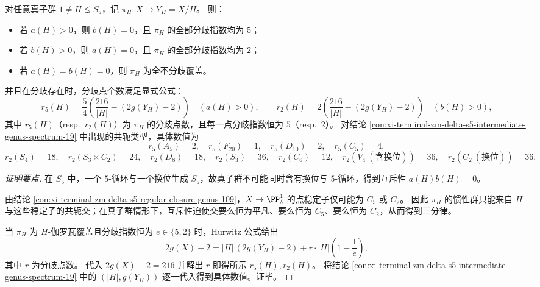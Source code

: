 \begin{conclusion}\label{con:xi-terminal-zm-delta-s5-branching-trichotomy-proper-quotients}
对任意真子群 \(1\neq H\lneq S_5\)，记 \(\pi_H:X\to Y_H=X/H\)。
则：
\begin{itemize}
  \item 若 \(a(H)>0\)，则 \(b(H)=0\)，且 \(\pi_H\) 的全部分歧指数均为 \(5\)；
  \item 若 \(b(H)>0\)，则 \(a(H)=0\)，且 \(\pi_H\) 的全部分歧指数均为 \(2\)；
  \item 若 \(a(H)=b(H)=0\)，则 \(\pi_H\) 为全不分歧覆盖。
\end{itemize}
并且在分歧存在时，分歧点个数满足显式公式：
\[
r_5(H)=\frac{5}{4}\left(\frac{216}{|H|}-(2g(Y_H)-2)\right)\quad(a(H)>0),
\qquad
r_2(H)=2\left(\frac{216}{|H|}-(2g(Y_H)-2)\right)\quad(b(H)>0),
\]
其中 \(r_5(H)\)（resp.\ \(r_2(H)\)）为 \(\pi_H\) 的分歧点数，且每一点分歧指数恒为 \(5\)（resp.\ \(2\)）。
对结论 \ref{con:xi-terminal-zm-delta-s5-intermediate-genus-spectrum-19} 中出现的共轭类型，具体数值为
\[
r_5(A_5)=2,\quad r_5(F_{20})=1,\quad r_5(D_{10})=2,\quad r_5(C_5)=4,
\]
\[
r_2(S_4)=18,\quad r_2(S_3\times C_2)=24,\quad r_2(D_8)=18,\quad r_2(S_3)=36,\quad r_2(C_6)=12,\quad r_2(V_4\ (\text{含换位}))=36,\quad r_2(C_2\ (\text{换位}))=36.
\]
\end{conclusion}
\begin{proof}[证明要点]
在 \(S_5\) 中，一个 \(5\)-循环与一个换位生成 \(S_5\)，故真子群不可能同时含有换位与 \(5\)-循环，得到互斥性 \(a(H)b(H)=0\)。
\par
由结论 \ref{con:xi-terminal-zm-delta-s5-regular-closure-genus-109}，\(X\to\PP^1_\delta\) 的点稳定子仅可能为 \(C_5\) 或 \(C_2\)。
因此 \(\pi_H\) 的惯性群只能来自 \(H\) 与这些稳定子的共轭交；在真子群情形下，互斥性迫使交要么恒为平凡、要么恒为 \(C_5\)、要么恒为 \(C_2\)，从而得到三分律。
\par
当 \(\pi_H\) 为 \(H\)-伽罗瓦覆盖且分歧指数恒为 \(e\in\{5,2\}\) 时，Hurwitz 公式给出
\[
2g(X)-2=|H|\,(2g(Y_H)-2)+r\cdot |H|\left(1-\frac1e\right),
\]
其中 \(r\) 为分歧点数。
代入 \(2g(X)-2=216\) 并解出 \(r\) 即得所示 \(r_5(H),r_2(H)\)。
将结论 \ref{con:xi-terminal-zm-delta-s5-intermediate-genus-spectrum-19} 中的 \((|H|,g(Y_H))\) 逐一代入得到具体数值。证毕。
\end{proof}


